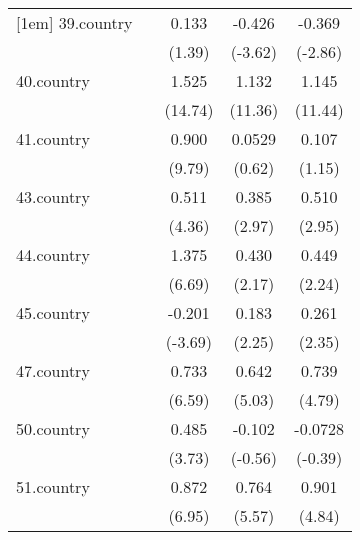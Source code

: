 {\begin{tabular}{l*{4}{c}}
[1em]
39.country  &                     &       0.133         &      -0.426\sym{***}&      -0.369\sym{**} \\
            &                     &      (1.39)         &     (-3.62)         &     (-2.86)         \\
[1em]
40.country  &                     &       1.525\sym{***}&       1.132\sym{***}&       1.145\sym{***}\\
            &                     &     (14.74)         &     (11.36)         &     (11.44)         \\
[1em]
41.country  &                     &       0.900\sym{***}&      0.0529         &       0.107         \\
            &                     &      (9.79)         &      (0.62)         &      (1.15)         \\
[1em]
43.country  &                     &       0.511\sym{***}&       0.385\sym{**} &       0.510\sym{**} \\
            &                     &      (4.36)         &      (2.97)         &      (2.95)         \\
[1em]
44.country  &                     &       1.375\sym{***}&       0.430\sym{*}  &       0.449\sym{*}  \\
            &                     &      (6.69)         &      (2.17)         &      (2.24)         \\
[1em]
45.country  &                     &      -0.201\sym{***}&       0.183\sym{*}  &       0.261\sym{*}  \\
            &                     &     (-3.69)         &      (2.25)         &      (2.35)         \\
[1em]
47.country  &                     &       0.733\sym{***}&       0.642\sym{***}&       0.739\sym{***}\\
            &                     &      (6.59)         &      (5.03)         &      (4.79)         \\
[1em]
50.country  &                     &       0.485\sym{***}&      -0.102         &     -0.0728         \\
            &                     &      (3.73)         &     (-0.56)         &     (-0.39)         \\
[1em]
51.country  &                     &       0.872\sym{***}&       0.764\sym{***}&       0.901\sym{***}\\
            &                     &      (6.95)         &      (5.57)         &      (4.84)         \\

\end{tabular}}
